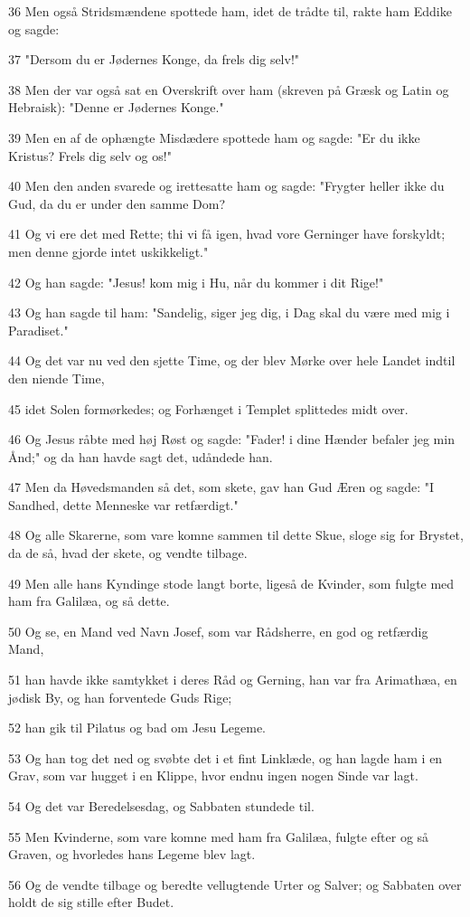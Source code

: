\par 36 Men også Stridsmændene spottede ham, idet de trådte til, rakte ham Eddike og sagde:
\par 37 "Dersom du er Jødernes Konge, da frels dig selv!"
\par 38 Men der var også sat en Overskrift over ham (skreven på Græsk og Latin og Hebraisk): "Denne er Jødernes Konge."
\par 39 Men en af de ophængte Misdædere spottede ham og sagde: "Er du ikke Kristus? Frels dig selv og os!"
\par 40 Men den anden svarede og irettesatte ham og sagde: "Frygter heller ikke du Gud, da du er under den samme Dom?
\par 41 Og vi ere det med Rette; thi vi få igen, hvad vore Gerninger have forskyldt; men denne gjorde intet uskikkeligt."
\par 42 Og han sagde: "Jesus! kom mig i Hu, når du kommer i dit Rige!"
\par 43 Og han sagde til ham: "Sandelig, siger jeg dig, i Dag skal du være med mig i Paradiset."
\par 44 Og det var nu ved den sjette Time, og der blev Mørke over hele Landet indtil den niende Time,
\par 45 idet Solen formørkedes; og Forhænget i Templet splittedes midt over.
\par 46 Og Jesus råbte med høj Røst og sagde: "Fader! i dine Hænder befaler jeg min Ånd;" og da han havde sagt det, udåndede han.
\par 47 Men da Høvedsmanden så det, som skete, gav han Gud Æren og sagde: "I Sandhed, dette Menneske var retfærdigt."
\par 48 Og alle Skarerne, som vare komne sammen til dette Skue, sloge sig for Brystet, da de så, hvad der skete, og vendte tilbage.
\par 49 Men alle hans Kyndinge stode langt borte, ligeså de Kvinder, som fulgte med ham fra Galilæa, og så dette.
\par 50 Og se, en Mand ved Navn Josef, som var Rådsherre, en god og retfærdig Mand,
\par 51 han havde ikke samtykket i deres Råd og Gerning, han var fra Arimathæa, en jødisk By, og han forventede Guds Rige;
\par 52 han gik til Pilatus og bad om Jesu Legeme.
\par 53 Og han tog det ned og svøbte det i et fint Linklæde, og han lagde ham i en Grav, som var hugget i en Klippe, hvor endnu ingen nogen Sinde var lagt.
\par 54 Og det var Beredelsesdag, og Sabbaten stundede til.
\par 55 Men Kvinderne, som vare komne med ham fra Galilæa, fulgte efter og så Graven, og hvorledes hans Legeme blev lagt.
\par 56 Og de vendte tilbage og beredte vellugtende Urter og Salver; og Sabbaten over holdt de sig stille efter Budet.

